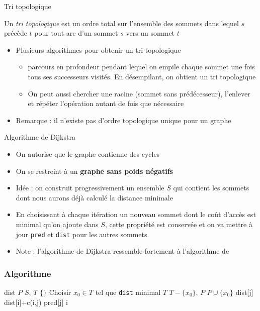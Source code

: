 \begin{frame}{Tri topologique}
    \begin{definition}
        Un \emph{tri topologique} est un ordre total sur l'ensemble des sommets dans lequel $s$ précède $t$ pour tout arc d'un sommet $s$ vers un sommet $t$
    \end{definition}
    \begin{itemize}
        \item Plusieurs algorithmes pour obtenir un tri topologique
        \begin{itemize}
            \item parcours en profondeur pendant lequel on empile chaque sommet une fois tous ses successeurs visités. En désempilant, on obtient un tri topologique
            \item On peut aussi chercher une racine (sommet sans prédécesseur), l'enlever et répéter l'opération autant de fois que nécessaire
        \end{itemize}
        \item Remarque : il n'existe pas d'ordre topologique unique pour un graphe 
    \end{itemize}
\end{frame}




\begin{frame}{Algorithme de Dijkstra}
    \begin{itemize}
        \item On autorise que le graphe contienne des cycles
        \item On se restreint à un \textbf{graphe sans poids négatifs}
        \item Idée : on construit progressivement un ensemble $S$ qui contient les sommets dont nous aurons déjà calculé la distance minimale 
        \item En choisissant à chaque itération un nouveau sommet dont le coût d'accès est minimal qu'on ajoute dans $S$, cette propriété est conservée et on va mettre à jour \texttt{pred} et \texttt{dist} pour les autres sommets
        \item Note : l'algorithme de Dijkstra ressemble fortement à l'algorithme de \prim
    \end{itemize}
\end{frame}

\begin{frame}[fragile]
    \frametitle{Algorithme}
    \begin{algorithmic}[1]
            \State dist 
            \State $P$ \gets $S$, $T$ \gets $\{\}$
                \State Choisir $x_0 \in T$ tel que \texttt{dist} minimal
                \State $T$ \gets $T-\{ x_0 \}$, $P$ \gets $P \cup \{ x_0 \}$  
                        \State dist[j] \gets dist[i]+c(i,j)
                        \State pred[j] \gets i
                    \EndIf 
                \EndFor
            \EndWhile
        \EndFunction
    \end{algorithmic}
\end{frame}


